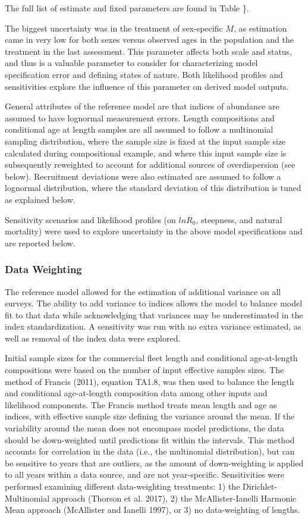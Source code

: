 \documentclass[
]{scrartcl}
\begin{document}
The full list of estimate and fixed parameters are found in Table \}.

The biggest uncertainty was in the treatment of sex-specific \(M\), as
estimation came in very low for both sexes versus observed ages in the
population and the treatment in the last assessment. This parameter
affects both scale and status, and thus is a valuable parameter to
consider for characterizing model specification error and defining
states of nature. Both likelihood profiles and sensitivities explore the
influence of this parameter on derived model outputs.

General attributes of the reference model are that indices of abundance
are assumed to have lognormal measurement errors. Length compositions
and conditional age at length samples are all assumed to follow a
multinomial sampling distribution, where the sample size is fixed at the
input sample size calculated during compositional example, and where
this input sample size is subsequently reweighted to account for
additional sources of overdispersion (see below). Recruitment deviations
were also estimated are assumed to follow a lognormal distribution,
where the standard deviation of this distribution is tuned as explained
below.

Sensitivity scenarios and likelihood profiles (on \(lnR_0\), steepness,
and natural mortality) were used to explore uncertainty in the above
model specifications and are reported below.

\subsubsection{Data Weighting}\label{data-weighting}

The reference model allowed for the estimation of additional variance on
all surveys. The ability to add variance to indices allows the model to
balance model fit to that data while acknowledging that variances may be
underestimated in the index standardization. A sensitivity was run with
no extra variance estimated, as well as removal of the index data were
explored.

Initial sample sizes for the commercial fleet length and conditional
age-at-length compositions were based on the number of input effective
samples sizes. The method of Francis (2011), equation TA1.8, was then
used to balance the length and conditional age-at-length composition
data among other inputs and likelihood components. The Francis method
treats mean length and age as indices, with effective sample size
defining the variance around the mean. If the variability around the
mean does not encompass model predictions, the data should be
down-weighted until predictions fit within the intervals. This method
accounts for correlation in the data (i.e., the multinomial
distribution), but can be sensitive to years that are outliers, as the
amount of down-weighting is applied to all years within a data source,
and are not year-specific. Sensitivities were performed examining
different data-weighting treatments: 1) the Dirichlet-Multinomial
approach (Thorson et al. 2017), 2) the McAllister-Ianelli Harmonic Mean
approach (McAllister and Ianelli 1997), or 3) no data-weighting of
lengths.
\end{document}
